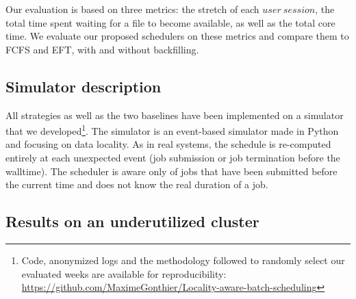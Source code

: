 \documentclass[conference]{IEEEtran}
\newcommand{\us}{\ensuremath{\mathit{user~session}}\xspace}
\begin{document}
Our evaluation is based on three metrics: the stretch of each \us, the total time spent waiting for a file to become available, as well as the total core time.
We evaluate our proposed schedulers on these metrics and compare them to FCFS and EFT, with and without backfilling.

\subsection{Simulator description}
All strategies as well as the two baselines have been implemented
on a simulator that we developed\footnote{Code, anonymized logs and the methodology followed to randomly select our evaluated weeks are available for reproducibility: \url{https://github.com/MaximeGonthier/Locality-aware-batch-scheduling}}.
The simulator is an event-based simulator made in Python and focusing on data locality.
As in real systems, the schedule is re-computed entirely at each unexpected event (job submission or job termination before the walltime).
The scheduler is aware only of jobs that have been submitted before the current time and does not know the real duration of a job.

\subsection{Results on an underutilized cluster}\label{sec.40}
\end{document}
